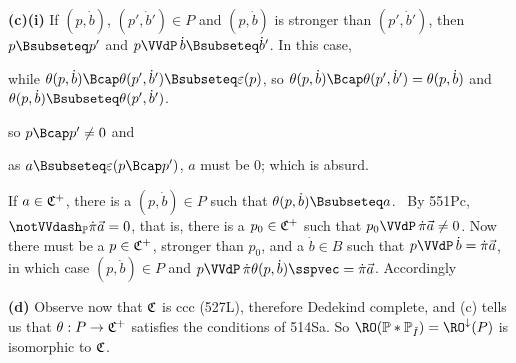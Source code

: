 {

{\bf (c)(i)} If $(p,\dot b)$, $(p',\dot b')\in P$ and $(p,\dot b)$ is
stronger than $(p',\dot b')$, then $p\Bsubseteq p'$ and
$p\VVdP\,\dot b\Bsubseteq\dot b'$.   In this case,
\ifnum{}

\else

\fi

\noindent while
$\theta(p,\dot b)\Bcap\theta(p',\dot b')\Bsubseteq\varepsilon(p)$, so
$\theta(p,\dot b)\Bcap\theta(p',\dot b')=\theta(p,\dot b)$ and
$\theta(p,\dot b)\Bsubseteq\theta(p',\dot b')$.

\medskip



\noindent so $p\Bcap p'\ne 0$ and


\noindent as $a\Bsubseteq\varepsilon(p\Bcap p')$, $a$ must be $0$;  which
is absurd.\ \Bang\Qed

\medskip

 If $a\in\frak C^+$, there is a
$(p,\dot b)\in P$ such that $\theta(p,\dot b)\Bsubseteq a$.   \Prf\
By 551Pc, $\notVVdash_{\Bbb P}\dot\pi\vec a=0$, that is, there is a
$p_0\in\frak C^+$ such that $p_0\VVdP\,\dot\pi\vec a\ne 0$.
Now there must be a
$p\in\frak C^+$, stronger than $p_0$,
and a $\dot b\in B$ such that
$p\VVdP\,\dot b=\dot\pi\vec a$, in which case $(p,\dot b)\in P$ and
$p\VVdP\,\dot\pi\theta(p,\dot b)\sspvec=\dot\pi\vec a$.   Accordingly

\Centerline{$\theta(p,\dot b)=\theta(p,\dot b)\Bcap\varepsilon(p)
=a\Bcap\varepsilon(p)\Bsubseteq a$.   \Qed}

\medskip

{\bf (d)} Observe now that $\frak C$ is ccc (527L), therefore Dedekind
complete, and (c) tells us that
$\theta:P\to\frak C^+$ satisfies the conditions
of 514Sa.     So
$\RO(\Bbb P*\Bbb P_{\check I})=\RO^{\downarrow}(P)$ is
isomorphic to $\frak C$.
}%

